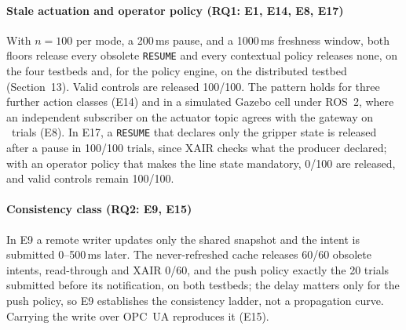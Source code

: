 \documentclass[11pt]{article}
\begin{document}
\paragraph{Stale actuation and operator policy (RQ1: E1, E14, E8, E17)}
With $n{=}100$ per mode, a 200\,ms pause, and a 1000\,ms freshness window, both floors release every obsolete \texttt{RESUME} and every contextual policy releases none, on the four testbeds and, for the policy engine, on the distributed testbed (Section~13). Valid controls are released 100/100. The pattern holds for three further action classes (E14) and in a simulated Gazebo cell under ROS~2, where an independent subscriber on the actuator topic agrees with the gateway on \EightWitness\ trials (E8). In E17, a \texttt{RESUME} that declares only the gripper state is released after a pause in 100/100 trials, since XAIR checks what the producer declared; with an operator policy that makes the line state mandatory, 0/100 are released, and valid controls remain 100/100.

\paragraph{Consistency class (RQ2: E9, E15)}
In E9 a remote writer updates only the shared snapshot and the intent is submitted 0--500\,ms later. The never-refreshed cache releases 60/60 obsolete intents, read-through and XAIR 0/60, and the push policy exactly the 20 trials submitted before its notification, on both testbeds; the delay matters only for the push policy, so E9 establishes the consistency ladder, not a propagation curve. Carrying the write over OPC~UA reproduces it (E15).
\end{document}
